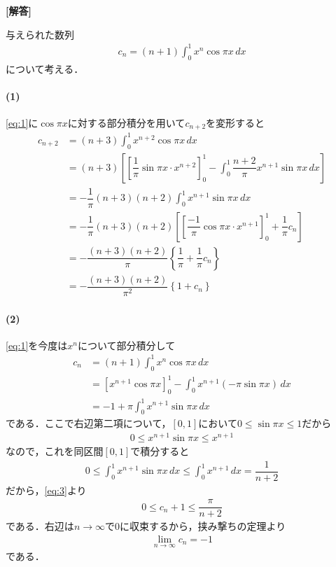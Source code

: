 \documentclass[../../main.tex]{subfiles}
\begin{document}
\begin{oframed}
  
\end{oframed}

{\bf [解答]}

与えられた数列
\begin{align}
  c_n = (n+1) \int_0^1 x^n \cos\pi x \, dx \label{eq:1}
\end{align}
について考える．

\paragraph{(1)}

\cref{eq:1}に$\cos\pi x$に対する部分積分を用いて$c_{n+2}$を変形すると
\begin{align}
  c_{n+2}
  &= (n+3) \int_0^1 x^{n+2} \cos\pi x \, dx \\
  &= (n+3) \left[ \left[ \dfrac{1}{\pi} \sin\pi x \cdot x^{n+2} \right]_0^1 - \int_0^1 \dfrac{n+2}{\pi} x^{n+1} \sin\pi x \, dx \right] \\
  &= - \dfrac{1}{\pi} (n+3)(n+2) \int_0^1 x^{n+1} \sin\pi x \, dx \label{eq:2} \\
  &= - \dfrac{1}{\pi} (n+3)(n+2) \left[ \left[ \dfrac{-1}{\pi} \cos\pi x \cdot x^{n+1} \right]_0^1 + \dfrac{1}{\pi} c_n \right] \\
  &= - \dfrac{(n+3)(n+2)}{\pi} \left\{ \dfrac{1}{\pi} + \dfrac{1}{\pi} c_n \right\} \\
  &= - \dfrac{(n+3)(n+2)}{\pi^2} \left\{ 1 + c_n \right\}
\end{align}

\paragraph{(2)}

\cref{eq:1}を今度は$x^{n}$について部分積分して
\begin{align}
  c_n
  &= (n+1)\int_0^1 x^n \cos\pi x \, dx \\
  &= \left[ x^{n+1} \cos\pi x \right]_0^1 - \int_0^1 x^{n+1} (-\pi \sin\pi x) \, dx \\
  &= -1 + \pi \int_0^1 x^{n+1} \sin\pi x \, dx \label{eq:3}
\end{align}
である．ここで右辺第二項について，$[0,1]$において$0 \le \sin\pi x \le 1$だから
\begin{align}
  0 \le x^{n+1} \sin\pi x \le x^{n+1}
\end{align}
なので，これを同区間$[0,1]$で積分すると
\begin{align}
  0 \le \int_0^1 x^{n+1} \sin\pi x \, dx \le \int_0^1 x^{n+1} \, dx = \dfrac{1}{n+2}
\end{align}
だから，\cref{eq:3}より
\begin{align}
  0 \le c_n + 1 \le \dfrac{\pi}{n+2} \label{eq:4}
\end{align}
である．右辺は$n\to\infty$で$0$に収束するから，挟み撃ちの定理より
\begin{align}
  \lim_{n\to\infty} c_n = -1 \label{eq:5}
\end{align}
である．
\end{document}
